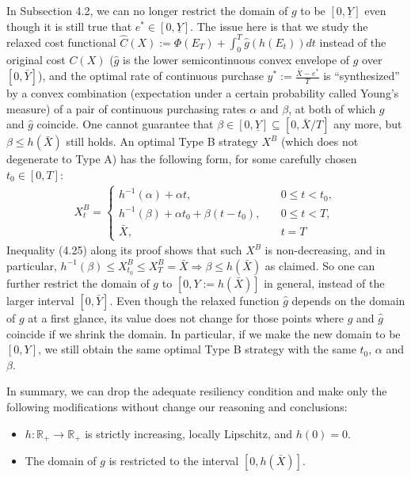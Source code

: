 \documentclass[openany,oneside]{article}
\theoremstyle{definition}
\theoremstyle{remark}
\begin{document}
In Subsection 4.2, we can no longer restrict the domain of $g$ to be $[0,\underline{Y}]$ even though it is still true that $e^\ast \in [0,\underline{Y}]$. The issue here is that we study the relaxed cost functional $\hat{C}(X) := \Phi(E_T) + \int_0^T \hat{g}(h(E_t)) dt$ instead of the original cost $C(X)$ ($\hat{g}$ is the lower semicontinuous convex envelope of $g$ over $[0,\bar{Y}]$), and the optimal rate of continuous purchase $y^\ast := \frac{\bar{X}-e^\ast}{T}$ is ``synthesized'' by a convex combination (expectation under a certain probability called Young's measure) of a pair of continuous purchasing rates $\alpha$ and $\beta$, at both of which $g$ and $\hat{g}$ coincide. One cannot guarantee that $\beta \in [0,\underline{Y}] \subseteq [0,\bar{X}/T]$ any more, but $\beta \le h(\bar{X})$ still holds. An optimal Type B strategy $X^B$ (which does not degenerate to Type A) has the following form, for some carefully chosen $t_0 \in [0,T]$:
\begin{align*}
X^B_t =
\begin{cases}
h^{-1}(\alpha) + \alpha t, & \quad 0\le t < t_0, \\
h^{-1}(\beta) + \alpha t_0 + \beta (t-t_0), & \quad 0\le t < T, \\
\bar{X}, & \quad t=T
\end{cases}
\end{align*}
Inequality (4.25) along its proof shows that such $X^B$ is non-decreasing, and in particular, $h^{-1}(\beta) \le X^B_{t_0} \le X^B_{T} = \bar{X} \Rightarrow \beta \le h(\bar{X})$ as claimed. So one can further restrict the domain of $g$ to $[0,Y:=h(\bar{X})]$ in general, instead of the larger interval $[0,\bar{Y}]$. Even though the relaxed function $\hat{g}$ depends on the domain of $g$ at a first glance, its value does not change for those points where $g$ and $\hat{g}$ coincide if we shrink the domain. In particular, if we make the new domain to be $[0,Y]$, we still obtain the same optimal Type B strategy with the same $t_0$, $\alpha$ and $\beta$.

In summary, we can drop the adequate resiliency condition and make only the following modifications without change our reasoning and conclusions:
\begin{itemize}
\item $h:\mathbb{R}_+ \to \mathbb{R}_+$ is strictly increasing, locally Lipschitz, and $h(0)=0$.
\item The domain of $g$ is restricted to the interval $[0,h(\bar{X})]$.
\end{itemize}
\end{document}
